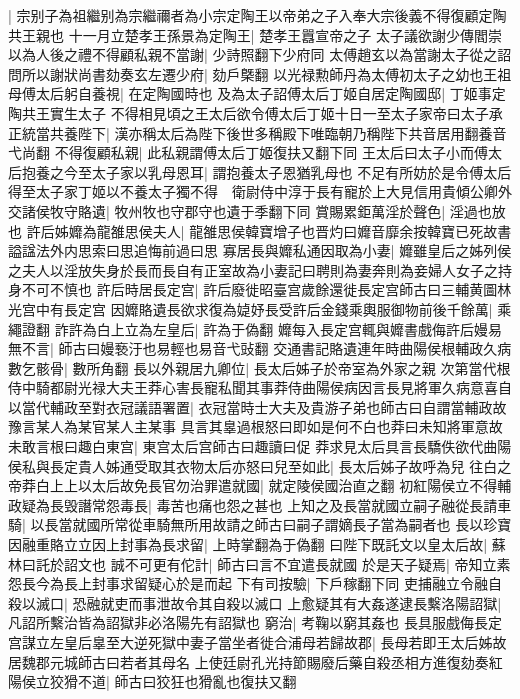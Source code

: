 |{
	宗别子為祖繼别為宗繼禰者為小宗定陶王以帝弟之子入奉大宗後義不得復顧定陶共王親也}
十一月立楚孝王孫景為定陶王|{
	楚孝王囂宣帝之子}
太子議欲謝少傳閻崇以為人後之禮不得顧私親不當謝|{
	少詩照翻下少府同}
太傅趙玄以為當謝太子從之詔問所以謝狀尚書劾奏玄左遷少府|{
	劾戶槩翻}
以光禄勲師丹為太傅初太子之幼也王祖母傅太后躬自養視|{
	在定陶國時也}
及為太子詔傅太后丁姬自居定陶國邸|{
	丁姬事定陶共王實生太子}
不得相見頃之王太后欲令傅太后丁姬十日一至太子家帝曰太子承正統當共養陛下|{
	漢亦稱太后為陛下後世多稱殿下唯臨朝乃稱陛下共音居用翻養音弋尚翻}
不得復顧私親|{
	此私親謂傅太后丁姬復扶又翻下同}
王太后曰太子小而傅太后抱養之今至太子家以乳母恩耳|{
	謂抱養太子恩猶乳母也}
不足有所妨於是令傅太后得至太子家丁姬以不養太子獨不得　衛尉侍中淳于長有寵於上大見信用貴傾公卿外交諸侯牧守賂遺|{
	牧州牧也守郡守也遺于季翻下同}
賞賜累鉅萬淫於聲色|{
	淫過也放也}
許后姊孊為龍雒思侯夫人|{
	龍雒思侯韓寶增子也晋灼曰孊音靡余按韓寶已死故書謚諡法外内思索曰思追悔前過曰思}
寡居長與孊私通因取為小妻|{
	孊雖皇后之姊列侯之夫人以淫放失身於長而長自有正室故為小妻記曰聘則為妻奔則為妾婦人女子之持身不可不慎也}
許后時居長定宫|{
	許后廢徙昭臺宫歲餘還徙長定宫師古曰三輔黄圖林光宫中有長定宫}
因孊賂遺長欲求復為媫妤長受許后金錢乘輿服御物前後千餘萬|{
	乘繩證翻}
詐許為白上立為左皇后|{
	許為于偽翻}
孊每入長定宫輒與孊書戲侮許后嫚易無不言|{
	師古曰嫚䙝汙也易輕也易音弋䜴翻}
交通書記賂遺連年時曲陽侯根輔政久病數乞骸骨|{
	數所角翻}
長以外親居九卿位|{
	長太后姊子於帝室為外家之親}
次第當代根侍中騎都尉光禄大夫王莽心害長寵私聞其事莽侍曲陽侯病因言長見將軍久病意喜自以當代輔政至對衣冠議語署置|{
	衣冠當時士大夫及貴游子弟也師古曰自謂當輔政故豫言某人為某官某人主某事}
具言其辠過根怒曰即如是何不白也莽曰未知將軍意故未敢言根曰趣白東宫|{
	東宫太后宫師古曰趣讀曰促}
莽求見太后具言長驕佚欲代曲陽侯私與長定貴人姊通受取其衣物太后亦怒曰兒至如此|{
	長太后姊子故呼為兒}
往白之帝莽白上上以太后故免長官勿治罪遣就國|{
	就定陵侯國治直之翻}
初紅陽侯立不得輔政疑為長毁譖常怨毒長|{
	毒苦也痛也怨之甚也}
上知之及長當就國立嗣子融從長請車騎|{
	以長當就國所常從車騎無所用故請之師古曰嗣子謂嫡長子當為嗣者也}
長以珍寶因融重賂立立因上封事為長求留|{
	上時掌翻為于偽翻}
曰陛下既託文以皇太后故|{
	蘇林曰託於詔文也}
誠不可更有佗計|{
	師古曰言不宜遣長就國}
於是天子疑焉|{
	帝知立素怨長今為長上封事求留疑心於是而起}
下有司按驗|{
	下戶稼翻下同}
吏捕融立令融自殺以滅口|{
	恐融就吏而事泄故令其自殺以滅口}
上愈疑其有大姦遂逮長繫洛陽詔獄|{
	凡詔所繫治皆為詔獄非必洛陽先有詔獄也}
窮治|{
	考鞠以窮其姦也}
長具服戲侮長定宫謀立左皇后辠至大逆死獄中妻子當坐者徙合浦母若歸故郡|{
	長母若即王太后姊故居魏郡元城師古曰若者其母名}
上使廷尉孔光持節賜廢后藥自殺丞相方進復劾奏紅陽侯立狡猾不道|{
	師古曰狡狂也猾亂也復扶又翻}
